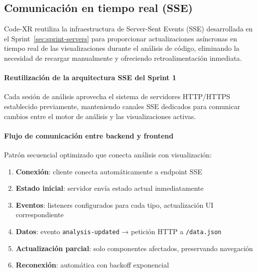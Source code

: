 \documentclass[a4paper, 12pt]{book}
\begin{document}
\subsection{Comunicación en tiempo real (SSE)}
\label{sec:comunicacion-sse}

Code-XR reutiliza la infraestructura de Server-Sent Events (SSE) desarrollada en el Sprint~\ref{sec:sprint-servers} para proporcionar actualizaciones asíncronas en tiempo real de las visualizaciones durante el análisis de código, eliminando la necesidad de recargar manualmente y ofreciendo retroalimentación inmediata.

\paragraph{Reutilización de la arquitectura SSE del Sprint 1}
Cada sesión de análisis aprovecha el sistema de servidores HTTP/HTTPS establecido previamente, manteniendo canales SSE dedicados para comunicar cambios entre el motor de análisis y las visualizaciones activas.

\paragraph{Flujo de comunicación entre backend y frontend}
Patrón secuencial optimizado que conecta análisis con visualización:

\begin{enumerate}
  \item \textbf{Conexión}: cliente conecta automáticamente a endpoint SSE
  \item \textbf{Estado inicial}: servidor envía estado actual inmediatamente
  \item \textbf{Eventos}: listeners configurados para cada tipo, actualización UI correspondiente
  \item \textbf{Datos}: evento \texttt{analysis-updated} → petición HTTP a \texttt{/data.json}
  \item \textbf{Actualización parcial}: solo componentes afectados, preservando navegación
  \item \textbf{Reconexión}: automática con backoff exponencial
\end{enumerate}
\end{document}
